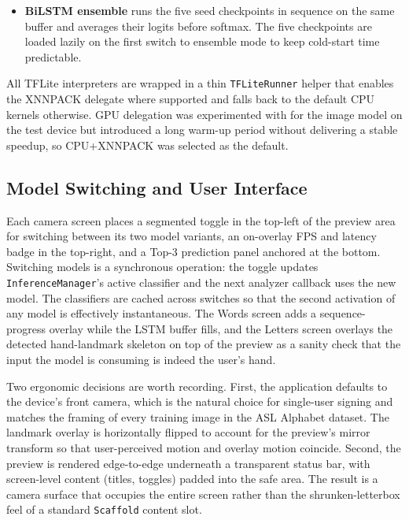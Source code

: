 \begin{itemize}
        eight consecutive analyzer callbacks ($\approx$270~ms), at
        which point the buffer is cleared, the countdown re-arms,
        and a new sign is accepted. Predictions below the dead-zone
        threshold do not latch: the sliding buffer continues to
        advance and the next full window is re-evaluated, which is
        the recovery path when the buffer spans a transition
        between two signs.
  \item \textbf{BiLSTM ensemble} runs the five seed checkpoints in
        sequence on the same buffer and averages their logits
        before softmax. The five checkpoints are loaded lazily on
        the first switch to ensemble mode to keep cold-start time
        predictable.
\end{itemize}

All TFLite interpreters are wrapped in a thin \texttt{TFLiteRunner}
helper that enables the XNNPACK delegate where supported and falls
back to the default CPU kernels otherwise. GPU delegation was
experimented with for the image model on the test device but
introduced a long warm-up period without delivering a stable
speedup, so CPU+XNNPACK was selected as the default.

\subsection{Model Switching and User Interface}
\label{sec:impl-android-ui}

Each camera screen places a segmented toggle in the top-left of the
preview area for switching between its two model variants, an
on-overlay FPS and latency badge in the top-right, and a Top-3
prediction panel anchored at the bottom. Switching models is a
synchronous operation: the toggle updates
\texttt{InferenceManager}'s active classifier and the next analyzer
callback uses the new model. The classifiers are cached across
switches so that the second activation of any model is effectively
instantaneous. The Words screen adds a sequence-progress overlay
while the LSTM buffer fills, and the Letters screen overlays the
detected hand-landmark skeleton on top of the preview as a sanity
check that the input the model is consuming is indeed the user's
hand.

Two ergonomic decisions are worth recording. First, the application
defaults to the device's front camera, which is the natural choice
for single-user signing and matches the framing of every training
image in the ASL Alphabet dataset. The landmark overlay is
horizontally flipped to account for the preview's mirror transform
so that user-perceived motion and overlay motion coincide. Second,
the preview is rendered edge-to-edge underneath a transparent
status bar, with screen-level content (titles, toggles) padded into
the safe area. The result is a camera surface that occupies the
entire screen rather than the shrunken-letterbox feel of a standard
\texttt{Scaffold} content slot.


